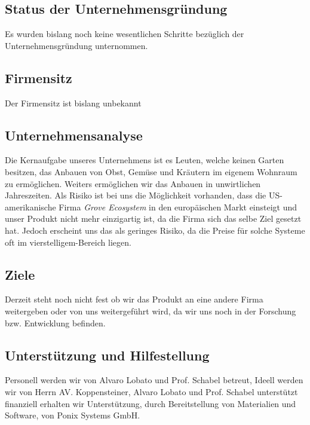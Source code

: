 \documentclass[11pt]{article}
\begin{document}
\subsection{Status der Unternehmensgründung}
Es wurden bislang noch keine wesentlichen Schritte bezüglich der Unternehmensgründung unternommen.
\subsection{Firmensitz}
Der Firmensitz ist bislang unbekannt
\subsection{Unternehmensanalyse}
Die Kernaufgabe unseres Unternehmens ist es Leuten, welche keinen Garten besitzen, das Anbauen von Obst, Gemüse und Kräutern im eigenem Wohnraum zu ermöglichen. Weiters ermöglichen wir das Anbauen in unwirtlichen Jahreszeiten.
Als Risiko ist bei uns die Möglichkeit vorhanden, dass die US-amerikanische Firma \textit{Grove Ecosystem} in den europäischen Markt einsteigt und unser Produkt nicht mehr einzigartig ist, da die Firma sich das selbe Ziel gesetzt hat. Jedoch erscheint uns das als geringes Risiko, da die Preise für solche Systeme oft im vierstelligem-Bereich liegen.
\subsection{Ziele}
Derzeit steht noch nicht fest ob wir das Produkt an eine andere Firma weitergeben oder von uns weitergeführt wird, da wir uns noch in der Forschung bzw. Entwicklung befinden.
\subsection{Unterstützung und Hilfestellung}
Personell werden wir von Alvaro Lobato und Prof. Schabel betreut, Ideell werden wir von Herrn AV. Koppensteiner, Alvaro Lobato und Prof. Schabel unterstützt finanziell erhalten wir Unterstützung, durch Bereitstellung von Materialien und Software, von Ponix Systems GmbH.
\end{document}
